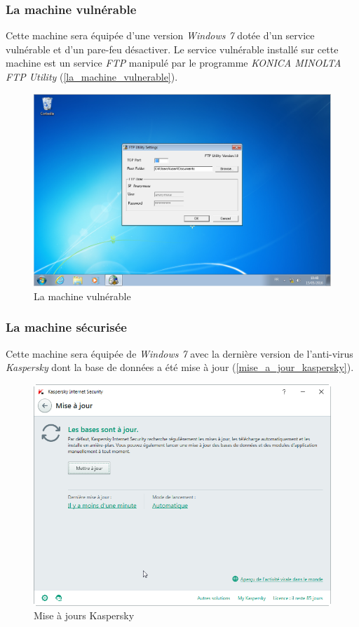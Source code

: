     \subsubsection{La machine vulnérable} \label{machine_vulnerable} 
    Cette machine sera équipée d'une version \emph{Windows 7}  
    dotée d'un service vulnérable et d'un pare-feu désactiver. Le service vulnérable installé sur cette 
    machine est un service \emph{FTP} manipulé par le programme \emph{KONICA MINOLTA FTP Utility} 
    (\autoref{la_machine_vulnerable}). %
    \begin{figure}[h!]
        \centering
        \includegraphics[scale=0.3]{images/Windows_7_2.png}
        \caption{La machine vulnérable}
        \label{la_machine_vulnerable}
    \end{figure}

    \subsubsection{La machine sécurisée} 
    Cette machine sera équipée de \emph{Windows 7} avec la dernière version de l'anti-virus \emph{Kaspersky} 
    dont la base de données a été mise à jour (\autoref{mise_a_jour_kaspersky}). %

    \begin{figure}[!h]
        \centering
        \includegraphics[width=\linewidth]{images/mise_a_jour_kaspersky.png}
        \caption{Mise à jours Kaspersky}
        \label{mise_a_jour_kaspersky}
    \end{figure}


